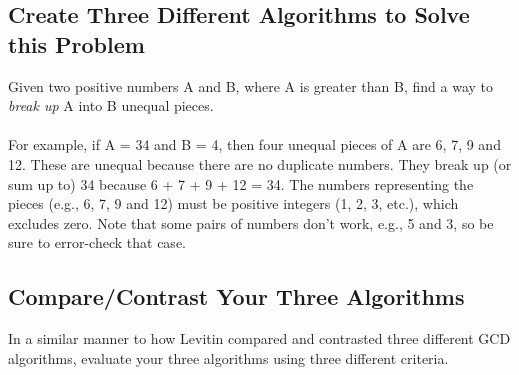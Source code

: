 \documentclass[12pt]{amsart}
\begin{document}
\subsection{Create Three Different Algorithms to Solve this Problem}
Given two positive numbers A and B, where A is greater than B, find a way to \textit{break up} A into B unequal pieces.\\\\For example, if A = 34 and B = 4, then four unequal pieces of A are 6, 7, 9 and 12. These are unequal because there are no duplicate numbers. They break up (or sum up to) 34 because 6 + 7 + 9 + 12 = 34. The numbers representing the pieces (e.g., 6, 7, 9 and 12) must be positive integers (1, 2, 3, etc.), which excludes zero. Note that some pairs of numbers don't work, e.g., 5 and 3, so be sure to error-check that case.

\subsection{Compare/Contrast Your Three Algorithms}
In a similar manner to how Levitin compared and contrasted three different GCD algorithms, evaluate your three algorithms using three different criteria.
\end{document}
